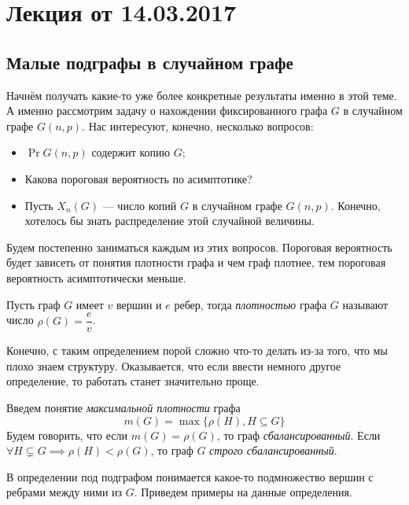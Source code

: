 \section{Лекция от 14.03.2017}

\subsection{Малые подграфы в случайном графе}

Начнём получать какие-то уже более конкретные результаты именно в этой теме.
А именно рассмотрим задачу о нахождении фиксированного графа $G$ в случайном
графе $G(n, p)$. Нас интересуют, конечно, несколько вопросов:

\begin{itemize}
  \item $\Pr{G(n, p) \text{ содержит копию } G}$;
  \item Какова пороговая вероятность по асимптотике?
  \item Пусть $X_n(G)$ --- число копий $G$ в случайном графе $G(n, p)$. Конечно,
  хотелось бы знать распределение этой случайной величины.
\end{itemize}

Будем постепенно заниматься каждым из этих вопросов. Пороговая вероятность будет
зависеть от понятия плотности графа и чем граф плотнее, тем пороговая вероятность
асимптотически меньше.

\begin{definition}
  Пусть граф $G$ имеет $v$ вершин и $e$ ребер, тогда \textit{плотностью} графа $G$ называют
  число $\rho(G) = \dfrac{e}{v}$.
\end{definition}

Конечно, с таким определением порой сложно что-то делать из-за того, что мы плохо
знаем структуру. Оказывается, что если ввести немного другое определение, то
работать станет значительно проще.

\begin{definition}
  Введем понятие \textit{максимальной плотности} графа
  \[
    m(G) = \max\{\rho(H), H \subseteq G\}
  \]
  Будем говорить, что если $m(G) = \rho(G)$, то граф \textit{сбалансированный}. Если
  $\forall H \varsubsetneq G \implies \rho(H) < \rho(G)$, то граф $G$ \textit{строго сбалансированный}.
\end{definition}

В определении под подграфом понимается какое-то подмножество вершин с ребрами между
ними из $G$. Приведем примеры на данные определения.

